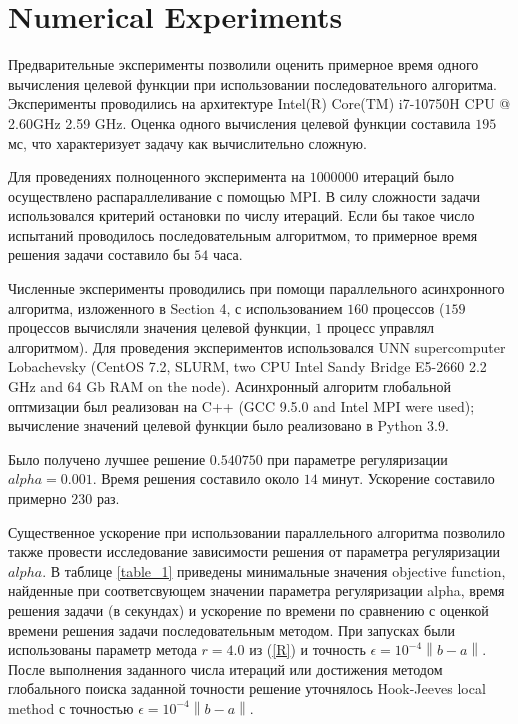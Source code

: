 \documentclass{svproc}
\begin{document}
\section{Numerical Experiments}\label{Sec_Exp}

Предварительные эксперименты позволили оценить примерное время одного вычисления целевой функции при использовании последовательного алгоритма. Эксперименты проводились на архитектуре Intel(R) Core(TM) i7-10750H CPU @ 2.60GHz 2.59 GHz. Оценка одного вычисления целевой функции составила $195$ мс, что характеризует задачу как вычислительно сложную.

Для проведениях полноценного эксперимента на $1 000 000$ итераций было осуществлено распараллеливание с помощью MPI. В силу сложности задачи использовался критерий остановки по числу итераций. Если бы такое число испытаний проводилось последовательным алгоритмом, то примерное время решения задачи составило бы $54$ часа.

Численные эксперименты проводились при помощи параллельного асинхронного алгоритма, изложенного в Section 4, с использованием $160$ процессов ($159$ процессов вычисляли значения целевой функции, $1$ процесс управлял алгоритмом). Для проведения экспериментов использовался UNN supercomputer Lobachevsky (CentOS 7.2, SLURM, two CPU Intel Sandy Bridge E5-2660 2.2 GHz and 64 Gb RAM on the node). Асинхронный алгоритм глобальной оптмизации был реализован на C++ (GCC 9.5.0 and Intel MPI were used); вычисление значений целевой функции было реализовано в Python 3.9.

Было получено лучшее решение $0.540750$ при параметре регуляризации $alpha = 0.001$. Время решения составило около $14$ минут. Ускорение составило примерно $230$ раз.

Существенное ускорение при использовании параллельного алгоритма позволило также провести исследование зависимости решения от параметра регуляризации $alpha$. В таблице \ref{table_1} приведены минимальные значения objective function, найденные при соответсвующем значении параметра регуляризации alpha, время решения задачи (в секундах) и ускорение по времени по сравнению с оценкой времени решения задачи последовательным методом. При запусках были использованы параметр метода $r=4.0$ из (\ref{R}) и точность $\epsilon = 10^{-4}\left\|b-a\right\|$. После выполнения заданного числа итераций или достижения методом глобального поиска заданной точности решение уточнялось Hook-Jeeves local method \cite{HookJeeves} с точностью $\epsilon = 10^{-4}\left\|b-a\right\|$.
\end{document}
